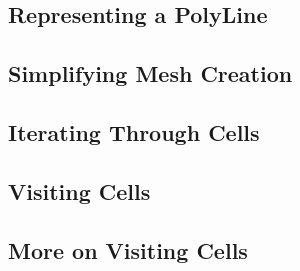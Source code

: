 


\subsection{Representing a PolyLine}
\label{sec:MeshPolyLine}




\subsection{Simplifying Mesh Creation}
\label{sec:AutomaticMesh}




\subsection{Iterating Through Cells}
\label{sec:MeshCellsIteration}




\subsection{Visiting Cells}
\label{sec:MeshCellVisitor}




\subsection{More on Visiting Cells}
\label{sec:MeshCellVisitorMultipleType}




